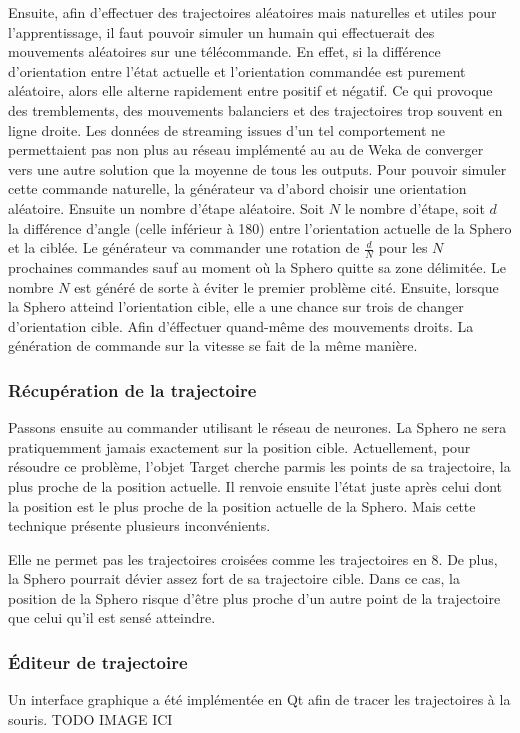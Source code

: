 Ensuite, afin d'effectuer des trajectoires aléatoires mais naturelles et utiles pour l'apprentissage, il faut pouvoir simuler un humain qui effectuerait des mouvements aléatoires sur une télécommande.
En effet, si la différence d'orientation entre l'état actuelle et l'orientation commandée est purement aléatoire, alors elle alterne rapidement entre positif et négatif.
Ce qui provoque des tremblements, des mouvements balanciers et des trajectoires trop souvent en ligne droite.
Les données de streaming issues d'un tel comportement ne permettaient pas non plus au réseau implémenté au au \mlp de Weka de converger vers une autre solution que la moyenne de tous les outputs.
Pour pouvoir simuler cette commande naturelle, la générateur va d'abord choisir une orientation aléatoire.
Ensuite un nombre d'étape aléatoire.
Soit $N$ le nombre d'étape, soit $d$ la différence d'angle (celle inférieur à 180) entre l'orientation actuelle de la Sphero et la ciblée.
Le générateur va commander une rotation de $\frac{d}{N}$ pour les $N$ prochaines commandes sauf au moment où la Sphero quitte sa zone délimitée.
Le nombre $N$ est généré de sorte à éviter le premier problème cité.
Ensuite, lorsque la Sphero atteind l'orientation cible, elle a une chance sur trois de changer d'orientation cible.
Afin d'éffectuer quand-même des mouvements droits.
La génération de commande sur la vitesse se fait de la même manière.

\subsubsection{Récupération de la trajectoire}
Passons ensuite au commander utilisant le réseau de neurones.
La Sphero ne sera pratiquemment jamais exactement sur la position cible.
Actuellement, pour résoudre ce problème, l'objet Target cherche parmis les points de sa trajectoire, la plus proche de la position actuelle.
Il renvoie ensuite l'état juste après celui dont la position est le plus proche de la position actuelle de la Sphero.
Mais cette technique présente plusieurs inconvénients.

Elle ne permet pas les trajectoires croisées comme les trajectoires en 8.
De plus, la Sphero pourrait dévier assez fort de sa trajectoire cible.
Dans ce cas, la position de la Sphero risque d'être plus proche d'un autre point de la trajectoire que celui qu'il est sensé atteindre.
\subsubsection{Éditeur de trajectoire}
Un interface graphique a été implémentée en Qt afin de tracer les trajectoires à la souris.
TODO IMAGE ICI